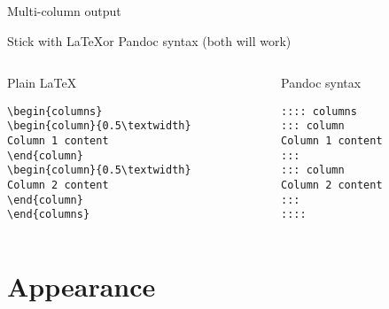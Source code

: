\documentclass[
  10pt,
  ignorenonframetext,
  aspectratio=169,
]{beamer}
\begin{document}
\begin{frame}[fragile]{Multi-column output}
\protect\hypertarget{multi-column-output}{}

Stick with \LaTeX or Pandoc syntax (both will work)

\begin{columns}[T]
\begin{column}{0.48\textwidth}
\begin{block}{Plain \LaTeX}

\begin{verbatim}
\begin{columns}
\begin{column}{0.5\textwidth}
Column 1 content
\end{column}
\begin{column}{0.5\textwidth}
Column 2 content
\end{column}
\end{columns}
\end{verbatim}

\end{block}
\end{column}

\begin{column}{0.48\textwidth}
\begin{block}{Pandoc syntax}

\begin{verbatim}
:::: columns
::: column
Column 1 content
:::
::: column
Column 2 content
:::
::::
\end{verbatim}

\end{block}
\end{column}
\end{columns}

\end{frame}

\hypertarget{appearance}{%
\section{Appearance}\label{appearance}}
\end{document}
